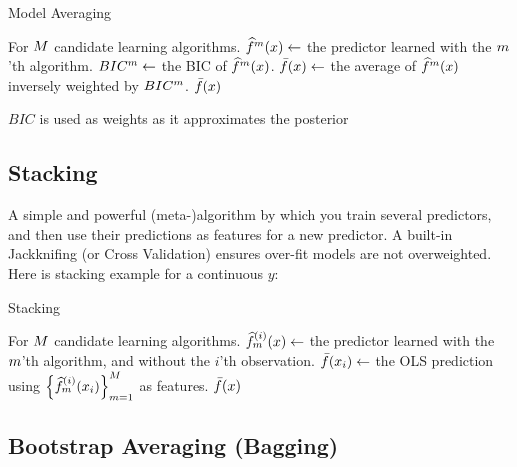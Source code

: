 \begin{algorithm}[H]
\caption{Model Averaging}
\label{algo:model_averaging}
\begin{algorithmic}
\State For $M$ candidate learning algorithms.
	\State $\widehat{f}^m(x) \gets$ the predictor learned with the $m$'th algorithm.
	\State $BIC^m \gets$ the BIC of $\widehat{f}^m(x)$.
\EndFor
\State $\bar{f}(x) \gets$ the average of $\widehat{f}^m(x)$ inversely weighted by $BIC^m$. 
\State \Return $\bar{f}(x)$
\end{algorithmic}
\end{algorithm}

$BIC$ is used as weights as it approximates the posterior 







\subsection{Stacking}
A simple and powerful (meta-)algorithm by which you train several predictors, and then use their predictions as features for a new predictor. 
A built-in Jackknifing (or Cross Validation) ensures over-fit models are not overweighted.
Here is  stacking example for a continuous $y$:

\begin{algorithm}[H]
\caption{Stacking}
\label{algo:stacking}
\begin{algorithmic}
\State For $M$ candidate learning algorithms.
		\State $\widehat{f}^{(i)}_m(x) \gets$ the predictor learned with the $m$'th algorithm, and without the $i$'th observation.
	\EndFor
	\State $\bar{f}(x_i) \gets$ the OLS prediction using $\left\{  \widehat{f}^{(i)}_m(x_i) \right\}_{m=1}^M$ as features. 
\EndFor
\State \Return $\bar{f}(x)$
\end{algorithmic}
\end{algorithm}







\subsection{Bootstrap Averaging (Bagging)}
\label{sec:bagging}

